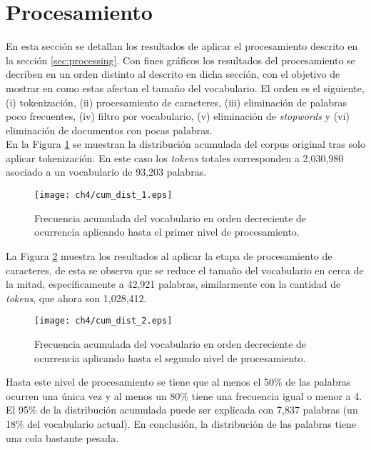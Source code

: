 \section{Procesamiento}
\label{sec:data_processing}

En esta sección se detallan los resultados de aplicar el procesamiento descrito en la sección \ref{sec:processing}. Con fines gráficos los resultados del procesamiento se decriben en un orden distinto al descrito en dicha sección, con el objetivo de mostrar en como estas afectan el tamaño del vocabulario. El orden es el siguiente, (i) tokenización, (ii) procesamiento de caracteres, (iii) eliminación de palabras poco frecuentes, (iv) filtro por vocabulario, (v) eliminación de \textit{stopwords} y (vi) eliminación de documentos con pocas palabras.\\

En la Figura \ref{img:cum_dist1} se muestran la distribución acumulada del corpus original tras solo aplicar tokenización. En este caso los \textit{tokens} totales corresponden a 2,030,980 asociado a un vocabulario de 93,203 palabras.\\

\begin{figure}
    \centering
    \texttt{[image: ch4/cum\_dist\_1.eps]}
    \caption{Frecuencia acumulada del vocabulario en orden decreciente de ocurrencia aplicando hasta el primer nivel de procesamiento.}
    \label{img:cum_dist1}
\end{figure}

La Figura \ref{img:cum_dist2} muestra los resultados al aplicar la etapa de procesamiento de caracteres, de esta se observa que se reduce el tamaño del vocabulario en cerca de la mitad, específicamente a 42,921 palabras, similarmente con la cantidad de \textit{tokens}, que ahora son 1,028,412.

\begin{figure}
    \centering
    \texttt{[image: ch4/cum\_dist\_2.eps]}
    \caption{Frecuencia acumulada del vocabulario en orden decreciente de ocurrencia aplicando hasta el segundo nivel de procesamiento.}
    \label{img:cum_dist2}
\end{figure}

Hasta este nivel de procesamiento se tiene que al menos el 50\% de las palabras ocurren una única vez y al menos un 80\% tiene una frecuencia igual o menor a 4. El 95\% de la distribución acumulada puede ser explicada con 7,837 palabras (un 18\% del vocabulario actual). En conclusión, la distribución de las palabras tiene una cola bastante pesada.\\

